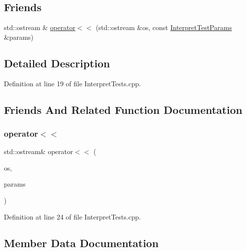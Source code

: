 \subsection*{Friends}
\begin{DoxyCompactItemize}
\item 
std\+::ostream \& \hyperlink{struct_interpret_test_params_a0f38144fe48e0672e466f59fea17dfc2}{operator$<$$<$} (std\+::ostream \&os, const \hyperlink{struct_interpret_test_params}{Interpret\+Test\+Params} \&params)
\end{DoxyCompactItemize}


\subsection{Detailed Description}


Definition at line 19 of file Interpret\+Tests.\+cpp.



\subsection{Friends And Related Function Documentation}
\mbox{\label{struct_interpret_test_params_a0f38144fe48e0672e466f59fea17dfc2}} 
\subsubsection{\texorpdfstring{operator$<$$<$}{operator<<}}
{\footnotesize\ttfamily std\+::ostream\& operator$<$$<$ (\begin{DoxyParamCaption}\item[{std\+::ostream \&}]{os,  }\item[{const \hyperlink{struct_interpret_test_params}{Interpret\+Test\+Params} \&}]{params }\end{DoxyParamCaption})\hspace{0.3cm}{\ttfamily [friend]}}



Definition at line 24 of file Interpret\+Tests.\+cpp.



\subsection{Member Data Documentation}
\mbox{\label{struct_interpret_test_params_a3e6aa774e846f241efaa2edf7de601b6}} 
